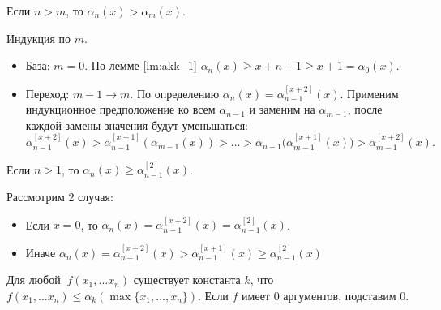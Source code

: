 \begin{lm}\label{lm:akk_3}
	Если $ n > m$, то $  \alpha _n(x) > \alpha _m(x)$.
\end{lm}
\begin{proof*}
    Индукция по $ m$.
	\begin{itemize}
		\item База: $ m=0$. По \hyperref[lm:akk_1]{лемме \ref{lm:akk_1}} $ \alpha _{n}(x) \ge x + n + 1 \ge  x + 1 = \alpha _0(x)$. 
		\item Переход: $ m -1 \to  m$. По определению $  \alpha _n(x) = \alpha _{n-1}^{[x+2]}(x)$. Применим индукционное предположение ко всем $ \alpha _{n-1}$  и  заменим на $ \alpha _{m-1}$, после каждой замены значения будут уменьшаться:
			\[
				\alpha _{n-1}^{[x+2]}(x) > \alpha _{n-1}^{[x+1]}( \alpha _{m-1}(x)) > \ldots > \alpha _{n-1}\bigl( \alpha _{m-1}^{[x+1]}(x) \bigr) > \alpha _{m-1}^{[x+2]}(x)
			.\] 
	\end{itemize}
\end{proof*}
\begin{lm}\label{lm:akk_4}
	Если $ n > 1$, то $  \alpha _{n}(x) \ge \alpha _{n-1}^{[2]}(x)$.
\end{lm}
\begin{proof*}
    Рассмотрим 2 случая:
    \begin{itemize}
        \item Если $ x = 0$, то $ \alpha_{n}(x) = \alpha_{n - 1}^{[x + 2]}(x) = \alpha_{n - 1}^{[2]}(x)$.
        \item Иначе $ \alpha_{n}(x) = \alpha_{n - 1}^{[x + 2]}(x) > \alpha_{n - 1}^{[x + 1]}(x) \ge \alpha_{n - 1}^{[2]}(x)$
    \end{itemize}
\end{proof*}
\begin{lm}\label{lm:akk_5}
	Для любой \prf $ ~f(x_1, \ldots x_n)$ существует константа $ k$, что $ f(x_1, \ldots x_{n}) \le \alpha _k( \max \{x_1, \ldots, x_{n}\})$. Если $ f$ имеет 0 аргументов, подставим  $ 0$.
\end{lm}
